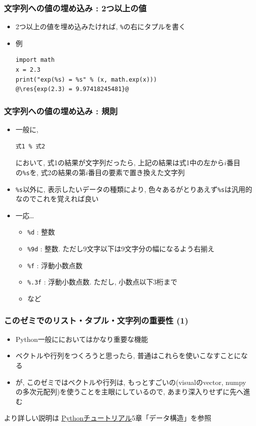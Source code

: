 \documentclass[10pt,dvipdfmx]{beamer}
\newcommand{\ore}[1]{{\color{orange}#1}}
\newcommand{\res}[1]{\ore{\textsl{#1}}}
\begin{document}
\begin{frame}[fragile]
\frametitle{文字列への値の埋め込み : 2つ以上の値}
\begin{itemize}
\item 2つ以上の値を埋め込みたければ, {\tt \%}の右にタプルを書く
\item 例
\begin{lstlisting}
import math
x = 2.3
print("exp(%s) = %s" % (x, math.exp(x)))
@\res{exp(2.3) = 9.97418245481}@
\end{lstlisting}
\end{itemize}
\end{frame}

\begin{frame}[fragile]
\frametitle{文字列への値の埋め込み : 規則}

\begin{itemize}
\item 一般に,
\begin{lstlisting}
式1 % 式2
\end{lstlisting}
において, 式1の結果が文字列だったら, 
上記の結果は式1中の左から$i$番目の{\tt \%s}を, 
式2の結果の第$i$番目の要素で置き換えた文字列

\item {\tt \%s}以外に, 表示したいデータの種類により,
色々あるがとりあえず{\tt \%s}は汎用的なのでこれを覚えれば良い
\item 一応\ldots
  \begin{itemize}
  \item {\tt \%d} : 整数
  \item {\tt \%9d} : 整数. ただし9文字以下は9文字分の幅になるよう右揃え
  \item {\tt \%f} : 浮動小数点数
  \item {\tt \%.3f} : 浮動小数点数. ただし, 小数点以下3桁まで
  \item など
  \end{itemize}
\end{itemize}
\end{frame}


\begin{frame}[fragile]
\frametitle{このゼミでのリスト・タプル・文字列の重要性 (1)}
\begin{itemize}
\item Python一般ににおいてはかなり重要な機能
\item ベクトルや行列をつくろうと思ったら,
  普通はこれらを使いこなすことになる
\item が, このゼミではベクトルや行列は, 
  もっとすごいの(visualのvector, 
  numpyの多次元配列)を使うことを主眼にしているので,
  あまり深入りせずに先へ進む
\end{itemize}

より詳しい説明は
\hyperlink{https://docs.python.jp/3.5/tutorial/index.html}
{Pythonチュートリアル}5章「データ構造」を参照
\end{frame}
\end{document}
